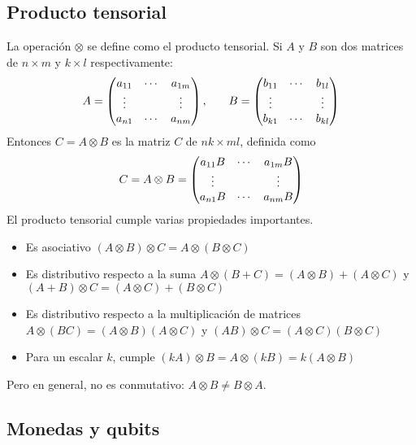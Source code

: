 \subsection{Producto tensorial}
\label{sss:producto-tensorial}

La operación $\otimes$ se define como el producto tensorial.  Si $A$ y $B$ 
son dos matrices de $n \times m$ y $k \times l$ respectivamente:
%
$$
\begin{array}{c c}
	A=\begin{pmatrix} 
		a_{11} & \cdots & a_{1m} \\
		\vdots &        & \vdots \\
		a_{n1} & \cdots & a_{nm}
	 \end{pmatrix}
	,\quad
	&
	B=\begin{pmatrix} 
		b_{11} & \cdots & b_{1l} \\
		\vdots &        & \vdots \\
		b_{k1} & \cdots & b_{kl}
	 \end{pmatrix}
\end{array}
$$
%
Entonces $C = A \otimes B$ es la matriz $C$ de $nk \times ml$, 
definida como
%
$$
C = A \otimes B = \begin{pmatrix} 
	a_{11} B & \cdots & a_{1m} B \\
	\vdots   &        & \vdots   \\
	a_{n1} B & \cdots & a_{nm} B
 \end{pmatrix}
$$
%
El producto tensorial cumple varias propiedades importantes.
%
\begin{itemize}
\item Es asociativo $(A \otimes B) \otimes C = A \otimes (B \otimes C)$

\item Es distributivo respecto a la suma $A \otimes (B + C) = (A \otimes B) + (A
\otimes C) $ y $(A + B) \otimes C = (A \otimes C) + (B \otimes C)$

\item Es distributivo respecto a la multiplicación de matrices $A \otimes (B 
 C) = (A \otimes B)  (A \otimes C) $ y $(A  B) \otimes C = (A 
\otimes C)  (B \otimes C)$

\item Para un escalar $k$, cumple $(kA) \otimes B = A \otimes (kB) = k (A 
\otimes B)$
\end{itemize}
%
Pero en general, no es conmutativo: $A \otimes B \neq B \otimes A$.

\subsection{Monedas y qubits}

